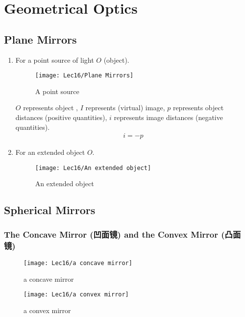 \newpage
\section{Geometrical Optics}

\subsection{Plane Mirrors}

\begin{enumerate}
    \item For a point source of light $O$ (object). 
    \begin{figure}[H]
        \centering
        \texttt{[image: Lec16/Plane Mirrors]}
        \caption{A point source}
    \end{figure}

    $O$ represents object , $I$ represents (virtual) image, $p$ represents object distances (positive quantities), $i$ represents image distances (negative quantities). 
    \begin{align*}
        i=-p
    \end{align*}

    \item For an extended object $O$. 
    \begin{figure}[H]
        \centering
        \texttt{[image: Lec16/An extended object]}
        \caption{An extended object}
    \end{figure}
\end{enumerate}

\subsection{Spherical Mirrors}

\subsubsection[The Concave Mirror and the Convex Mirror]{ The Concave Mirror (凹面镜) and the Convex Mirror (凸面镜)}
\begin{figure}[H]
    \centering
    \begin{minipage}{0.22\textwidth}
        \centering
        \texttt{[image: Lec16/a concave mirror]}
        \caption{a concave mirror}
    \end{minipage}
    \begin{minipage}{0.22\textwidth}
        \centering
        \texttt{[image: Lec16/a convex mirror]}
        \caption{a convex mirror}
    \end{minipage}
\end{figure}

